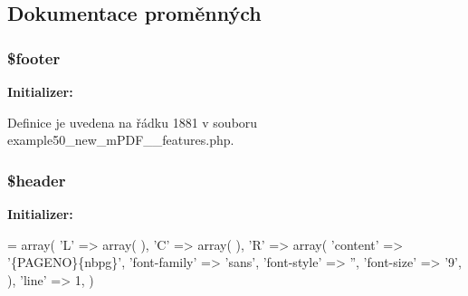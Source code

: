 \subsection{Dokumentace proměnných}
\hypertarget{example50__new__m_p_d_f__3__features_8php_abaa4216c852c51c380dd8f10d3cfe944}{
\subsubsection[{\$footer}]{\setlength{\rightskip}{0pt plus 5cm}\$footer}}\label{example50__new__m_p_d_f__3__features_8php_abaa4216c852c51c380dd8f10d3cfe944}
{\bfseries Initializer\-:}


Definice je uvedena na řádku 1881 v souboru example50\-\_\-new\-\_\-m\-P\-D\-F\-\_\-\_\-features.\-php.

\hypertarget{example50__new__m_p_d_f__3__features_8php_a4f44601f2b9dc8a1644bce53c94ce622}{
\subsubsection[{\$header}]{\setlength{\rightskip}{0pt plus 5cm}\$header}}\label{example50__new__m_p_d_f__3__features_8php_a4f44601f2b9dc8a1644bce53c94ce622}
{\bfseries Initializer\-:}
\begin{DoxyCode}
= array(
    \textcolor{charliteral}{'L'} => array(
    ),
    \textcolor{charliteral}{'C'} => array(
    ),
    \textcolor{charliteral}{'R'} => array(
        \textcolor{stringliteral}{'content'} => \textcolor{stringliteral}{'\{PAGENO\}\{nbpg\}'},
        \textcolor{stringliteral}{'font-family'} => \textcolor{stringliteral}{'sans'},
        \textcolor{stringliteral}{'font-style'} => \textcolor{stringliteral}{''},
        \textcolor{stringliteral}{'font-size'} => \textcolor{charliteral}{'9'}, 
    ),
    \textcolor{stringliteral}{'line'} => 1,
)
\end{DoxyCode}


